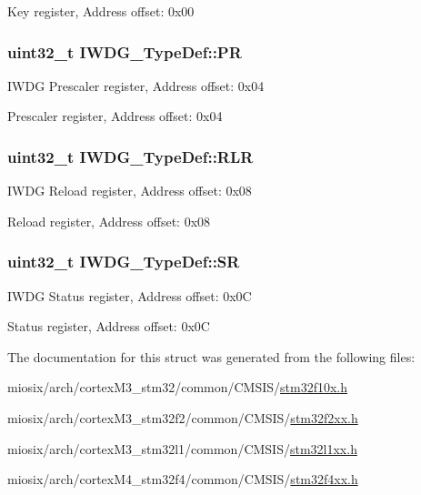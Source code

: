 Key register, Address offset\-: 0x00 \hypertarget{struct_i_w_d_g___type_def_a5f2717885ff171e686e0347af9e6b68d}{
\subsubsection[{P\-R}]{ uint32\-\_\-t I\-W\-D\-G\-\_\-\-Type\-Def\-::\-P\-R}}\label{struct_i_w_d_g___type_def_a5f2717885ff171e686e0347af9e6b68d}
I\-W\-D\-G Prescaler register, Address offset\-: 0x04

Prescaler register, Address offset\-: 0x04 \hypertarget{struct_i_w_d_g___type_def_aa3703eaa40e447dcacc69c0827595532}{
\subsubsection[{R\-L\-R}]{ uint32\-\_\-t I\-W\-D\-G\-\_\-\-Type\-Def\-::\-R\-L\-R}}\label{struct_i_w_d_g___type_def_aa3703eaa40e447dcacc69c0827595532}
I\-W\-D\-G Reload register, Address offset\-: 0x08

Reload register, Address offset\-: 0x08 \hypertarget{struct_i_w_d_g___type_def_a9bbfbe921f2acfaf58251849bd0a511c}{
\subsubsection[{S\-R}]{ uint32\-\_\-t I\-W\-D\-G\-\_\-\-Type\-Def\-::\-S\-R}}\label{struct_i_w_d_g___type_def_a9bbfbe921f2acfaf58251849bd0a511c}
I\-W\-D\-G Status register, Address offset\-: 0x0\-C

Status register, Address offset\-: 0x0\-C 

The documentation for this struct was generated from the following files\-:\begin{DoxyCompactItemize}
\item 
miosix/arch/cortex\-M3\-\_\-stm32/common/\-C\-M\-S\-I\-S/\hyperlink{stm32f10x_8h}{stm32f10x.\-h}\item 
miosix/arch/cortex\-M3\-\_\-stm32f2/common/\-C\-M\-S\-I\-S/\hyperlink{stm32f2xx_8h}{stm32f2xx.\-h}\item 
miosix/arch/cortex\-M3\-\_\-stm32l1/common/\-C\-M\-S\-I\-S/\hyperlink{stm32l1xx_8h}{stm32l1xx.\-h}\item 
miosix/arch/cortex\-M4\-\_\-stm32f4/common/\-C\-M\-S\-I\-S/\hyperlink{stm32f4xx_8h}{stm32f4xx.\-h}\end{DoxyCompactItemize}
